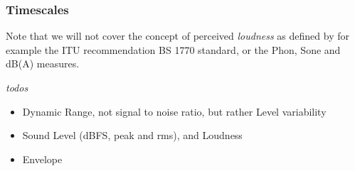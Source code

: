 \documentclass[../main2.tex]{subfiles}
\begin{document}
\subsubsection{Timescales}
Note that we will not cover the concept of perceived \emph{loudness} as defined by for example the ITU recommendation BS 1770 standard, or the Phon, Sone and dB(A) measures.

\emph{todos}
\begin{itemize}
	\item Dynamic Range, not signal to noise ratio, but rather Level variability
	\item Sound Level (dBFS, peak and rms), and Loudness
	\item Envelope
\end{itemize}
\end{document}
